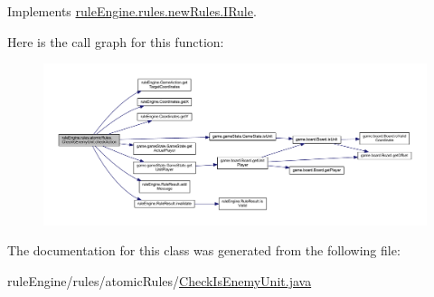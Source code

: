 Implements \mbox{\hyperlink{interfacerule_engine_1_1rules_1_1new_rules_1_1_i_rule_a72ce29a47d7a5fba75a09444a50a481e}{rule\+Engine.\+rules.\+new\+Rules.\+I\+Rule}}.

Here is the call graph for this function\+:
\nopagebreak
\begin{figure}[H]
\begin{center}
\leavevmode
\includegraphics[width=350pt]{classrule_engine_1_1rules_1_1atomic_rules_1_1_check_is_enemy_unit_a0f5a8e1e1d38431310489f7c6bdb9776_cgraph}
\end{center}
\end{figure}


The documentation for this class was generated from the following file\+:\begin{DoxyCompactItemize}
\item 
rule\+Engine/rules/atomic\+Rules/\mbox{\hyperlink{_check_is_enemy_unit_8java}{Check\+Is\+Enemy\+Unit.\+java}}\end{DoxyCompactItemize}
